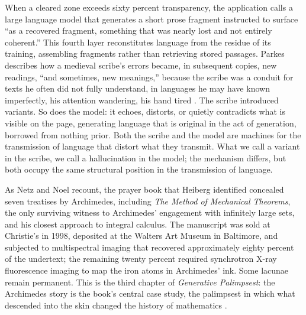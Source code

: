 \documentclass[12pt]{article}
\begin{document}
When a cleared zone exceeds sixty percent transparency, the application calls a
large language model that generates a short prose fragment instructed to surface
``as a recovered fragment, something that was nearly lost and not entirely
coherent.'' This fourth layer reconstitutes language from the residue of its training,
assembling fragments rather than retrieving stored passages. Parkes
describes how a medieval scribe's errors became, in subsequent copies, new
readings, ``and sometimes, new meanings,'' because the scribe was a conduit for
texts he often did not fully understand, in languages he may have known
imperfectly, his attention wandering, his hand tired \parencite{parkes1991}.
The scribe introduced
variants. So does the model: it echoes, distorts, or quietly contradicts what
is visible on the page, generating language that is original in the act of
generation, borrowed from nothing prior. Both the scribe and the model are machines
for the transmission of language that distort what they transmit. What we call a
variant in the scribe, we call a hallucination in the model; the mechanism
differs, but both occupy the same structural position in the transmission of
language.

As Netz and Noel recount, the prayer book that Heiberg identified concealed
seven treatises by Archimedes, including \textit{The Method of Mechanical
  Theorems}, the only surviving witness to Archimedes' engagement with infinitely
large sets, and his closest approach to integral calculus. The manuscript was
sold at Christie's in 1998, deposited at the Walters Art Museum in Baltimore,
and subjected to multispectral imaging that recovered approximately eighty
percent of the undertext; the remaining twenty percent required synchrotron
X-ray fluorescence imaging to map the iron atoms in Archimedes' ink. Some
lacunae remain permanent. This is the third chapter of \textit{Generative
  Palimpsest}: the Archimedes story is the book's central case study, the
palimpsest in which what descended into the skin changed the history of
mathematics \parencite{netz2007}.
\end{document}

